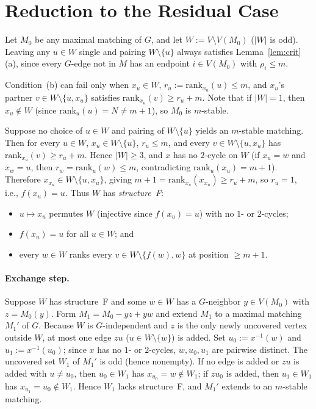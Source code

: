 \documentclass[11pt]{article}
\begin{document}
\section{Reduction to the Residual Case}\label{sec:residual}

Let $M_0$ be any maximal matching of $G$, and let $W := V \setminus V(M_0)$ ($|W|$ is odd). Leaving any $u \in W$ single and pairing $W \setminus \{u\}$ always satisfies Lemma~\ref{lem:crit}(a), since every $G$-edge not in $M$ has an endpoint $i \in V(M_0)$ with $\rho_i \le m$.

Condition~(b) can fail only when $x_u \in W$, $r_u := \mathrm{rank}_{x_u}(u) \le m$, and $x_u$'s partner $v \in W \setminus \{u, x_u\}$ satisfies $\mathrm{rank}_{x_u}(v) \ge r_u + m$. Note that if $|W| = 1$, then $x_u \notin W$ (since $\mathrm{rank}_u(u) = N \neq m+1$), so $M_0$ is $m$-stable.

Suppose no choice of $u \in W$ and pairing of $W \setminus \{u\}$ yields an $m$-stable matching. Then for every $u \in W$, $x_u \in W \setminus \{u\}$, $r_u \le m$, and every $v \in W \setminus \{u, x_u\}$ has $\mathrm{rank}_{x_u}(v) \ge r_u + m$. Hence $|W| \ge 3$, and $x$ has no $2$-cycle on $W$ (if $x_u = w$ and $x_w = u$, then $r_w = \mathrm{rank}_u(w) \le m$, contradicting $\mathrm{rank}_u(x_u) = m+1$). Therefore $x_{x_u} \in W \setminus \{u, x_u\}$, giving $m+1 = \mathrm{rank}_{x_u}(x_{x_u}) \ge r_u + m$, so $r_u = 1$, i.e., $f(x_u) = u$. Thus $W$ has \emph{structure~F}:
\begin{itemize}
  \item $u \mapsto x_u$ permutes $W$ (injective since $f(x_u) = u$) with no $1$- or $2$-cycles;
  \item $f(x_u) = u$ for all $u \in W$; and
  \item every $w \in W$ ranks every $v \in W \setminus \{f(w), w\}$ at position $\ge m+1$.
\end{itemize}

\paragraph{Exchange step.} Suppose $W$ has structure~F and some $w \in W$ has a $G$-neighbor $y \in V(M_0)$ with $z = M_0(y)$. Form $M_1 = M_0 - yz + yw$ and extend $M_1$ to a maximal matching $M_1'$ of $G$. Because $W$ is $G$-independent and $z$ is the only newly uncovered vertex outside $W$, at most one edge $zu$ ($u \in W \setminus \{w\}$) is added. Set $u_0 := x^{-1}(w)$ and $u_1 := x^{-1}(u_0)$; since $x$ has no $1$- or $2$-cycles, $w, u_0, u_1$ are pairwise distinct. The uncovered set $W_1$ of $M_1'$ is odd (hence nonempty). If no edge is added or $zu$ is added with $u \neq u_0$, then $u_0 \in W_1$ has $x_{u_0} = w \notin W_1$; if $zu_0$ is added, then $u_1 \in W_1$ has $x_{u_1} = u_0 \notin W_1$. Hence $W_1$ lacks structure~F, and $M_1'$ extends to an $m$-stable matching.
\end{document}
